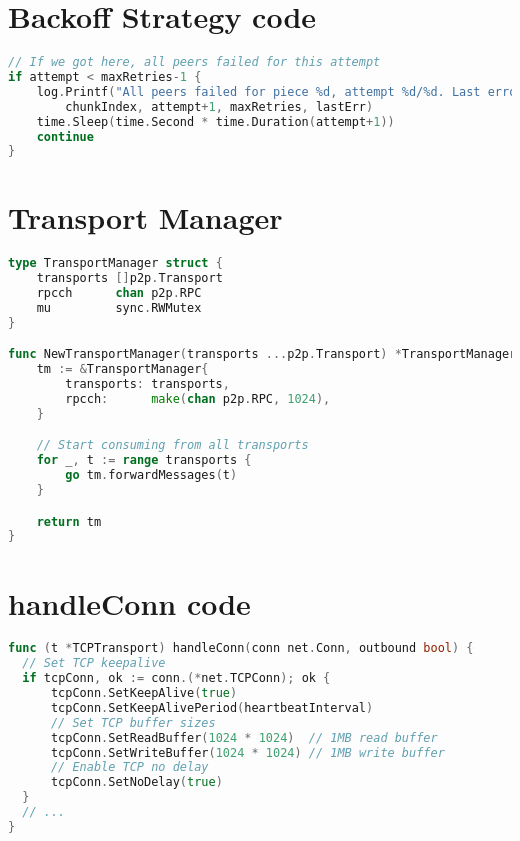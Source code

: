 \documentclass[12pt,a4paper]{report}
\begin{document}
\section{Backoff Strategy code}
\begin{lstlisting}[language=Go, caption={Backoff strategy implementation}, label={lst:backoff-strategy}]
// If we got here, all peers failed for this attempt
if attempt < maxRetries-1 {
    log.Printf("All peers failed for piece %d, attempt %d/%d. Last error: %v",
        chunkIndex, attempt+1, maxRetries, lastErr)
    time.Sleep(time.Second * time.Duration(attempt+1))
    continue
}
\end{lstlisting}

\section{Transport Manager}
\begin{lstlisting}[language=Go, caption={Transport Manager implementation}, label={lst:transport-manager}]
type TransportManager struct {
    transports []p2p.Transport
    rpcch      chan p2p.RPC
    mu         sync.RWMutex
}

func NewTransportManager(transports ...p2p.Transport) *TransportManager {
    tm := &TransportManager{
        transports: transports,
        rpcch:      make(chan p2p.RPC, 1024),
    }

    // Start consuming from all transports
    for _, t := range transports {
        go tm.forwardMessages(t)
    }

    return tm
}
\end{lstlisting}

\section{handleConn code}
\begin{lstlisting}[language=Go, caption={handleConn optimisations}, label={lst:handleConn}]
func (t *TCPTransport) handleConn(conn net.Conn, outbound bool) {
  // Set TCP keepalive
  if tcpConn, ok := conn.(*net.TCPConn); ok {
      tcpConn.SetKeepAlive(true)
      tcpConn.SetKeepAlivePeriod(heartbeatInterval)
      // Set TCP buffer sizes
      tcpConn.SetReadBuffer(1024 * 1024)  // 1MB read buffer
      tcpConn.SetWriteBuffer(1024 * 1024) // 1MB write buffer
      // Enable TCP no delay
      tcpConn.SetNoDelay(true)
  }
  // ...
}
\end{lstlisting}
\end{document}
